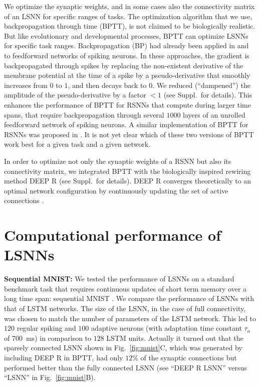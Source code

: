\documentclass{article} \pdfoutput=1
\begin{document}
We optimize the synaptic weights, and in some cases also the connectivity matrix of an LSNN for specific ranges of tasks. 
The optimization algorithm that we use, backpropagation through time (BPTT), is not claimed to be biologically realistic. But like evolutionary and developmental processes, BPTT can optimize LSNNs for specific task ranges.
Backpropagation (BP) had already been
applied in \cite{courbariaux_binarized_2016} and \cite{esser_convolutional_2016} to feedforward networks of spiking
neurons. In these approaches, the gradient is backpropagated
through spikes by replacing the non-existent derivative of the membrane potential at the time of a
spike by a pseudo-derivative that smoothly increases from $0$ to $1$, and then decays back to $0$.
We reduced (``dampened'') the amplitude of the pseudo-derivative by a factor  $< 1$ (see Suppl.~for details).
This enhances the performance of BPTT for RSNNs that compute during larger time spans,
that require backpropagation through several $1000$ layers of an unrolled feedforward network of spiking neurons.
A similar implementation of BPTT for RSNNs was proposed in \cite{huh2017gradient}.
It is not yet clear which of these two versions of BPTT work best for a given task and a given network.

In order to optimize not only the synaptic weights of a RSNN but also its connectivity matrix, we integrated BPTT with the biologically inspired \cite{kappel2017reward} rewiring method DEEP R \cite{deepr}  (see Suppl.~for details). DEEP R converges theoretically to an optimal network configuration by continuously updating the set of active connections \cite{kappel_network_2015,kappel2017reward,deepr}.





\section{Computational performance of LSNNs}\label{sec:comp_cap}


\textbf{Sequential MNIST:}
We tested the performance of LSNNs on a standard benchmark task that requires continuous updates of short term memory over a long time span: sequential MNIST \cite{LeJH15, costa2017cortical}.
We compare the performance of LSNNs with that of LSTM networks.
The size of the LSNN, in the case of full connectivity, was chosen to match the number of parameters of the LSTM network.
This led to $120$ regular spiking and $100$ adaptive neurons (with adaptation time constant $\tau_a$ of $700$~ms) in comparison to $128$ LSTM units.
Actually it turned out that the sparsely connected LSNN shown in Fig.~\ref{fig:mnist}C,
which was generated by including DEEP R in BPTT, had only $12\%$ of the synaptic connections but performed better than the fully connected LSNN (see ``DEEP R LSNN'' versus ``LSNN'' in Fig.~\ref{fig:mnist}B).
\end{document}
